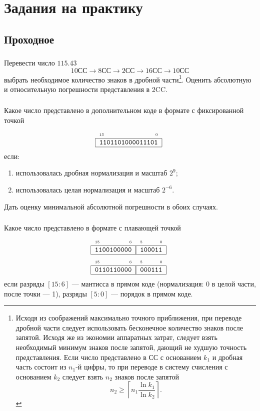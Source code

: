         
\appendix

\section{Задания на практику}


\subsection{Проходное}

\begin{frame}
    \frametitle{\TaskSimpleNumber}

    Перевести число $115.43$ 
    \[
        \text{10СС}\to\text{8СС}\to\text{2СС}\to\text{16СС}\to\text{10СС}
    \]
    выбрать необходимое количество знаков в дробной части\footnote{
        Исходя из соображений максимально точного приближения, при переводе дробной части следует использовать бесконечное количество знаков после запятой. Исходя же из экономии аппаратных затрат, следует взять необходимый минимум знаков после запятой, дающий не худшую точность представления. Если число представлено в СС с основанием $k_1$ и дробная часть состоит из $n_1$-й цифры, то при переводе в систему счисления с основанием $k_2$ следует взять $n_2$ знаков после запятой
        \[
            n_2 \ge \left\lceil n_1\frac{\ln{k_1}}{\ln{k_2}} \right\rceil.
        \]
    }. Оценить абсолютную и относительную погрешности представления в 2CC.
\end{frame}
        
\begin{frame}
    \frametitle{\TaskSimpleNumber}

    Какое число представлено в дополнительном коде в формате с фиксированной точкой 
    \[
        \UnsignedTwoBytes{1101101000011101}
    \]
    если:
    \begin{enumerate}
        \item использовалась дробная нормализация и масштаб $2^9$;
        \item использовалась целая нормализация и масштаб $2^{-6}$.
    \end{enumerate}
    Дать оценку минимальной абсолютной погрешности в обоих случаях.
\end{frame}
        
\begin{frame}
    \frametitle{\TaskSimpleNumber}

    Какое число представлено в формате с плавающей точкой
    \begin{align*}
        \FloatMySimpleHex{1100100000}{100011}\\
        \FloatMySimpleHex{0110110000}{000111}
    \end{align*}
    если разряды $[15:6]$ --- мантисса в прямом коде (нормализация: 0 в целой части, после точки --- 1), разряды $[5:0]$ --- порядок в прямом коде.
\end{frame}
        
